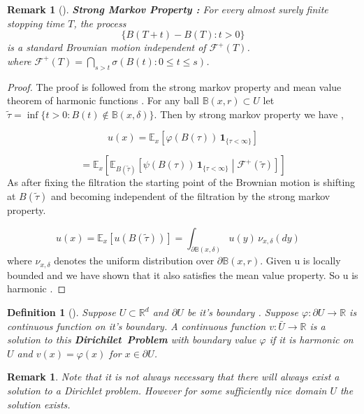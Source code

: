 \documentclass[11pt, a4paper, oneside]{report}
\numberwithin{equation}{section}
\newtheorem{remark}[theorem]{Remark}
\newtheorem{definition}[theorem]{Definition}
\begin{document}
\begin{remark}[{\cite[Theorem 2.16]{PeresMortersBook}}]
\textbf{Strong Markov Property :} 
For every almost surely finite stopping time \( T \),  
the process  
\[
\{ B(T + t) - B(T) : t > 0 \}
\]  
is a standard Brownian motion independent of \( \mathcal{F}^{+}(T) \).\\
where \( \mathcal{F}^{+}(T) = \bigcap_{s > t} \sigma(B(t) : 0 \leq t \leq s)\).

\end{remark}
\begin{proof}
The proof is followed from the strong markov property and mean value theorem of harmonic functions . For any ball \(\mathbb{B}(x,r) \subset U\) let \(
\tilde{\tau} = \inf\{t > 0 : B(t) \notin \mathbb{B}(x, \delta)\}
\). Then by strong markov property we have ,

\[
u(x) = \mathbb{E}_x \left[ \varphi(B(\tau)) \, \mathbf{1}_{\{\tau < \infty\}} \right]
\]

\[
= \mathbb{E}_x \left[ \mathbb{E}_{B(\tilde{\tau})} \left[ \psi(B(\tau)) \, \mathbf{1}_{\{\tau < \infty\}} \middle| \mathcal{F}^+(\tilde{\tau}) \right] \right]
\]
As after fixing the filtration the starting point of the Brownian motion is shifting at \(B(\tilde{\tau})\) and becoming independent of the filtration by the strong markov property.

\[ u(x)
= \mathbb{E}_x \left[ u(B(\tilde{\tau})) \right]
= \int_{\partial \mathbb{B}(x,\delta)} u(y) \, \nu_{x,\delta}(dy) \quad 
\]
where \(\nu_{x,\delta}\) denotes the uniform distribution over \(\partial{\mathbb{B}(x,r)}\). Given u is locally bounded and we have shown that it also satisfies the mean value property. So u is harmonic .



\end{proof}
\begin{definition}[{\cite[Definition 3.9]{PeresMortersBook}}]
Suppose \(U \subset \mathbb{R}^d \) and \(\partial{U}\) be it's boundary . Suppose \(\varphi : \partial{U} \to \mathbb{R}\) is continuous function on it's boundary. A continuous function \(v : \bar{U} \to \mathbb{R}\) is a solution to this \textbf{Dirichilet\ Problem} with boundary value \(\varphi\) if it is harmonic on \(U\) and \(v(x)=\varphi(x)\) for \(x \in \partial{U}\).
\end{definition}
\begin{remark}
Note that it is not always necessary that there will always exist a solution to a Dirichlet problem. However for some sufficiently nice domain \(U\) the solution exists.
\end{remark}
\end{document}
